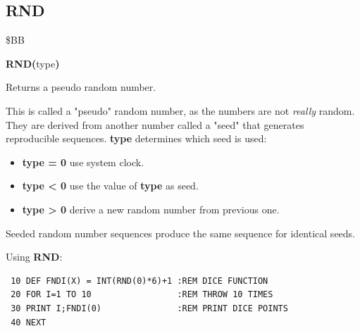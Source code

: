 
\newpage
\subsection{RND}
\begin{description}[leftmargin=2cm,style=nextline]
\item [Token:] \$BB
\item [Format:] {\bf RND(}type{\bf)}
\item [Usage:] Returns a pseudo random number.

               This is called a "pseudo" random number, as
               the numbers are not {\it really} random. They are derived
               from another number called a "seed" that generates
               reproducible sequences. {\bf type}
               determines which seed is used:

                \begin{itemize}
                    \item {\bf type = 0} use system clock.
                    \item {\bf type < 0} use the value of {\bf type} as seed.
                    \item {\bf type > 0} derive a new random number from previous one.
                \end{itemize}

\item [Remarks:] Seeded random number sequences produce the same
                 sequence for identical seeds.
\item [Example:] Using {\bf RND}:
\begin{tcolorbox}[colback=black,coltext=white]
\verbatimfont{\codefont}
\begin{verbatim}
 10 DEF FNDI(X) = INT(RND(0)*6)+1 :REM DICE FUNCTION
 20 FOR I=1 TO 10                 :REM THROW 10 TIMES
 30 PRINT I;FNDI(0)               :REM PRINT DICE POINTS
 40 NEXT
\end{verbatim}
\end{tcolorbox}
\end{description}


\newpage
